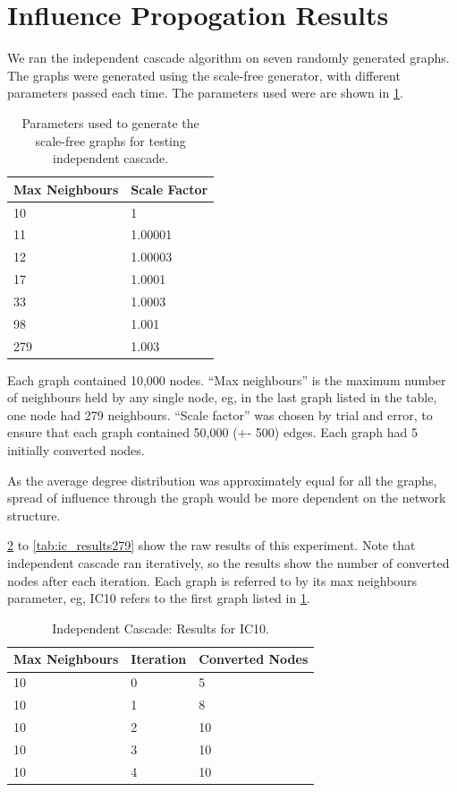 \section{Influence Propogation Results}

We ran the independent cascade algorithm on seven randomly generated graphs. The graphs were generated using the scale-free generator, with different parameters passed each time. The parameters used were are shown in \ref{tab:ic_graphs}.

\begin{table}
\centering
\begin{tabular}{|l|l|}
\hline
Max Neighbours & Scale Factor \\
\hline
10 & 1 \\
11 & 1.00001 \\
12 & 1.00003 \\
17 & 1.0001 \\
33 & 1.0003 \\
98 & 1.001 \\
279 & 1.003 \\
\hline
\end{tabular}
\caption{Parameters used to generate the scale-free graphs for testing independent cascade.}
\label{tab:ic_graphs}
\end{table}

Each graph contained 10,000 nodes. ``Max neighbours'' is the maximum number of neighbours held by any single node, eg, in the last graph listed in the table, one node had 279 neighbours. ``Scale factor'' was chosen by trial and error, to ensure that each graph contained 50,000 (+- 500) edges. Each graph had 5 initially converted nodes.

As the average degree distribution was approximately equal for all the graphs, spread of influence through the graph would be more dependent on the network structure.

\ref{tab:ic_results10} to \ref{tab:ic_results279} show the raw results of this experiment. Note that independent cascade ran iteratively, so the results show the number of converted nodes after each iteration. Each graph is referred to by its max neighbours parameter, eg, IC10 refers to the first graph listed in \ref{tab:ic_graphs}.

\begin{table}
\centering
\begin{tabular}{|l||l|l|}
\hline
Max Neighbours & Iteration & Converted Nodes \\
\hline
10 & 0 & 5 \\
10 & 1 & 8 \\
10 & 2 & 10 \\
10 & 3 & 10 \\
10 & 4 & 10 \\
\hline
\end{tabular}
\caption{Independent Cascade: Results for IC10.}
\label{tab:ic_results10}
\end{table}

